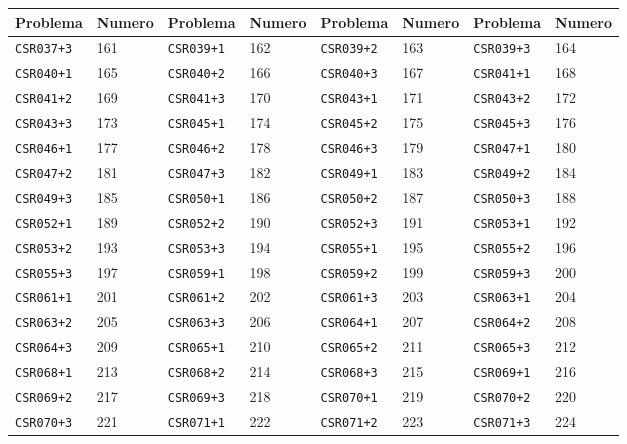 \documentclass[./main.tex]{subfiles}
\begin{document}
\begin{table}[H]
\begin{tabularx}{\textwidth}{| X | X | X | X | X | X | X | X |}
\hline
Problema & Numero & Problema & Numero & Problema & Numero & Problema & Numero \\
\hline
\texttt{CSR037+3} & 161 & \texttt{CSR039+1} & 162 & \texttt{CSR039+2} & 163 & \texttt{CSR039+3} & 164\\
\hline
\texttt{CSR040+1} & 165 & \texttt{CSR040+2} & 166 & \texttt{CSR040+3} & 167 & \texttt{CSR041+1} & 168\\
\hline
\texttt{CSR041+2} & 169 & \texttt{CSR041+3} & 170 & \texttt{CSR043+1} & 171 & \texttt{CSR043+2} & 172\\
\hline
\texttt{CSR043+3} & 173 & \texttt{CSR045+1} & 174 & \texttt{CSR045+2} & 175 & \texttt{CSR045+3} & 176\\
\hline
\texttt{CSR046+1} & 177 & \texttt{CSR046+2} & 178 & \texttt{CSR046+3} & 179 & \texttt{CSR047+1} & 180\\
\hline
\texttt{CSR047+2} & 181 & \texttt{CSR047+3} & 182 & \texttt{CSR049+1} & 183 & \texttt{CSR049+2} & 184\\
\hline
\texttt{CSR049+3} & 185 & \texttt{CSR050+1} & 186 & \texttt{CSR050+2} & 187 & \texttt{CSR050+3} & 188\\
\hline
\texttt{CSR052+1} & 189 & \texttt{CSR052+2} & 190 & \texttt{CSR052+3} & 191 & \texttt{CSR053+1} & 192\\
\hline
\texttt{CSR053+2} & 193 & \texttt{CSR053+3} & 194 & \texttt{CSR055+1} & 195 & \texttt{CSR055+2} & 196\\
\hline
\texttt{CSR055+3} & 197 & \texttt{CSR059+1} & 198 & \texttt{CSR059+2} & 199 & \texttt{CSR059+3} & 200\\
\hline
\texttt{CSR061+1} & 201 & \texttt{CSR061+2} & 202 & \texttt{CSR061+3} & 203 & \texttt{CSR063+1} & 204\\
\hline
\texttt{CSR063+2} & 205 & \texttt{CSR063+3} & 206 & \texttt{CSR064+1} & 207 & \texttt{CSR064+2} & 208\\
\hline
\texttt{CSR064+3} & 209 & \texttt{CSR065+1} & 210 & \texttt{CSR065+2} & 211 & \texttt{CSR065+3} & 212\\
\hline
\texttt{CSR068+1} & 213 & \texttt{CSR068+2} & 214 & \texttt{CSR068+3} & 215 & \texttt{CSR069+1} & 216\\
\hline
\texttt{CSR069+2} & 217 & \texttt{CSR069+3} & 218 & \texttt{CSR070+1} & 219 & \texttt{CSR070+2} & 220\\
\hline
\texttt{CSR070+3} & 221 & \texttt{CSR071+1} & 222 & \texttt{CSR071+2} & 223 & \texttt{CSR071+3} & 224\\

\end{tabularx}
\end{table}
\end{document}
